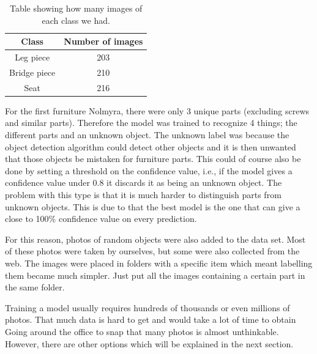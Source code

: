\begin{table}[h]
\centering
\begin{tabular}{ |c|c| } 
 \hline
 Class &  Number of images  \\ 
 \hline
 Leg piece & 203 \\ 
 \hline
 Bridge piece & 210 \\ 
  \hline
 Seat & 216 \\ 
 \hline
\end{tabular}
\caption{Table showing how many images of each class we had.}
\label{table:imageclassnumbers}
\end{table}

For the first furniture Nolmyra, there were only 3 unique parts (excluding screws and similar parts). Therefore the model was trained to recognize 4 things; the different parts and an unknown object. The unknown label was because the object detection algorithm could detect other objects and it is then unwanted that those objects be mistaken for furniture parts. This could of course also be done by setting a threshold on the confidence value, i.e., if the model gives a confidence value under 0.8 it discards it as being an unknown object. The problem with this type is that it is much harder to distinguish parts from unknown objects. This is due to that the best model is the one that can give a close to 100\% confidence value on every prediction.

For this reason, photos of random objects were also added to the data set. Most of these photos were taken by ourselves, but some were also collected from the web. The images were placed in folders with a specific item which meant labelling them became much simpler. Just put all the images containing a certain part in the same folder.

Training a model usually requires hundreds of thousands or even millions of photos. That much data is hard to get and would take a lot of time to obtain Going around the office to snap that many photos is almost unthinkable.
However, there are other options which will be explained in the next section.

